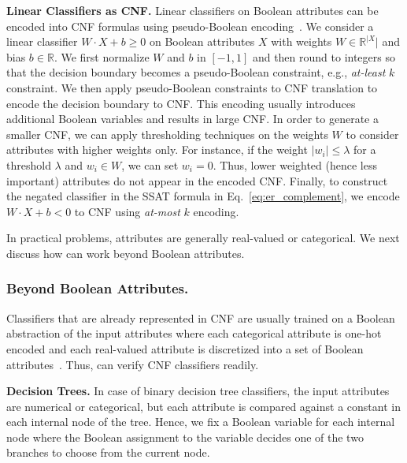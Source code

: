 \textbf{Linear Classifiers as CNF.} Linear classifiers on Boolean attributes can  be encoded into CNF formulas using pseudo-Boolean encoding~\cite{philipp2015pblib}. We consider a linear classifier  $ W\cdot X + b \ge 0 $ on Boolean attributes $ X $ with weights $ W \in \mathbb{R}^{|X}| $ and bias $ b \in \mathbb{R} $.  We first normalize $ W$ and $b $ in $ [-1,1] $ and then round to integers so that the decision boundary becomes a pseudo-Boolean constraint, e.g., \textit{at-least} $ k $ constraint.  We then apply  pseudo-Boolean constraints to CNF translation to encode the decision boundary to CNF. This encoding usually introduces additional Boolean variables and results in large CNF. In order to generate a smaller CNF, we can apply thresholding techniques on the weights $ W $ to consider attributes with higher weights only. For instance, if the weight $  |w_i| \le \lambda $ for a threshold $ \lambda $ and $ w_i \in W $, we can set $ w_i = 0 $. Thus,  lower weighted (hence less important) attributes do not appear in the encoded CNF.  Finally, to construct the negated classifier in the SSAT formula in Eq.~\ref{eq:er_complement}, we encode $ W\cdot X + b < 0 $ to CNF using \textit{at-most} $ k $ encoding. 

In practical problems, attributes are generally real-valued or categorical. We next discuss how {\framework} can work beyond Boolean attributes. 


\subsubsection{Beyond Boolean Attributes.}
Classifiers that are already represented in CNF are usually trained on a Boolean abstraction of the input attributes where  each categorical attribute is one-hot encoded  and each real-valued attribute is discretized into a set of Boolean attributes~\cite{LKCL2019,GMM20}. Thus, {\framework} can verify CNF classifiers readily. 

\textbf{Decision Trees.} In case of binary decision tree classifiers, the input attributes are numerical or categorical, but each attribute is compared against a constant in each internal node of the tree. Hence, we fix a Boolean variable for each internal node where the Boolean assignment to the variable decides one of the two branches to choose from the current node.  

